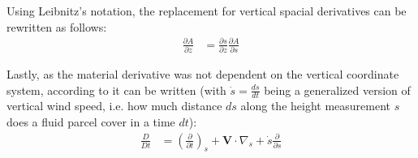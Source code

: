Using Leibnitz's notation, the replacement for vertical spacial derivatives can be rewritten as follows:
\begin{align}
\frac{\partial A}{\partial z} &= \frac{\partial s}{\partial z} \frac{\partial A}{\partial s}\label{id_v_diff}
\end{align}

Lastly, as the material derivative was not dependent on the vertical coordinate system, according to \cite{kasahara1974various} it can be written (with $\dot{s}=\frac{ds}{dt}$ being a generalized version of vertical wind speed, i.e. how much distance $ds$ along the height measurement $s$ does a fluid parcel cover in a time $dt$):
\begin{align}
\frac{D}{Dt} &= \left(\frac{\partial}{\partial t}\right)_s + \textbf{V} \cdot \nabla _s + \dot{s}\frac{\partial }{\partial s}\label{id_t_diff}
\end{align}




